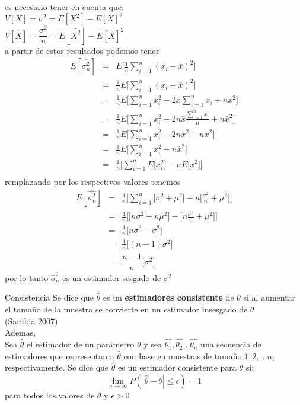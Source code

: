 \documentclass[base=hide,11pt]{elegantbook}
\begin{document}
{			
es necesario tener en cuenta que: \\
$V[X]=\sigma^ {2}=E[X^{2}]-E[X]^{2}$\\
$V[\bar{X}]=\dfrac{\sigma^ {2}}{n}=E[\bar{X^{2}}]-E[\bar{X}]^{2}$ \\
a partir de estos resultados podemos tener
\begin{eqnarray*}
E[\widehat{\sigma^{2}_{n}}]&=&E\Bigg[\frac{1}{n}\sum_{i=1}^ {n}(x_{i}-\bar{x})^{2}\Bigg]\\
&=&\frac{1}{n} E\Bigg[\sum_{i=1}^ {n}(x_{i}-\bar{x})^{2}\Bigg]\\
&=&\frac{1}{n} E\Bigg[\sum_{i=1}^ {n}x_{i}^{2}-2\bar{x} \sum_{i=1}^ {n} x_{i} +  n\bar{x}^{2}\Bigg]\\
&=&\frac{1}{n} E\Bigg[\sum_{i=1}^ {n}x_{i}^{2}-2n\bar{x} \frac{\sum_{i=1}^ {n} x_{i}}{n} +  n\bar{x}^{2}\Bigg]\\
&=&\frac{1}{n} E\Bigg[\sum_{i=1}^ {n}x_{i}^{2}-2n\bar{x}^{2} +  n\bar{x}^{2}\Bigg]\\
&=&\frac{1}{n} E\Bigg[\sum_{i=1}^ {n} x_{i}^{2}-n\bar{x}^{2}\Bigg]\\
&=&\frac{1}{n} \Bigg[\sum_{i=1}^ {n} E\big[x_{i}^{2}\big]-n E\big[\bar{x}^{2}\big]\Bigg]\\
\end{eqnarray*} 
remplazando por los respectivos valores tenemos
\begin{eqnarray*}
E[\widehat{\sigma^{2}_{n}}]&=&\frac{1}{n} \Bigg[\sum_{i=1}^ {n} \Big[ \sigma^{2}+\mu^ {2}\Big]-n \Big[\frac{\sigma^{2}}{n}+\mu^ {2}\Big]\Bigg]\\
&=&\frac{1}{n} \Bigg[\Big[n\sigma^{2}+n\mu^{2} \Big]- \Big[n \frac{\sigma^{2}}{n}+\mu^ {2}\Big]\Bigg]\\
&=&\frac{1}{n} \Bigg[ n \sigma^{2} - \sigma^{2}\Bigg] \\
&=&\frac{1}{n} \Bigg[ (n-1) \sigma^{2} \Bigg] \\
&=&\dfrac{n-1}{n}\big[\sigma^{2}\big]
\end{eqnarray*}
			por lo tanto $\widehat{\sigma}^{2}_{n}$ es  un estimador sesgado de $\sigma^{2}$ \\
			
			
%			
\begin{Box2}{Consistencia}
%			
Se dice que $\widehat{\theta}$ es un {\bf estimadores consistente} de $\theta$ si al aumentar el tamaño de la muestra se convierte en un estimador insesgado de $\theta$\\ 
(Sarabia 2007) 
\\
Ademas,\\ 		
%			
Sea $\widehat{\theta}$ el estimador de un parámetro $\theta$ y sea $\widehat{\theta_{1}},\widehat{\theta_{2}}...\widehat{\theta_{n}}$ una secuencia de estimadores que representan a $\widehat{\theta}$ con base en muestras de tamaño $1,2,...n$, respectivamente. Se dice que $\widehat{\theta}$ es un estimador consistente para $\theta$ si:
$$\lim_{n \to \infty} P(|\widehat{\theta} - \theta|\leq \epsilon)=1 $$
para todos los valores de $\theta$ y $\epsilon>0$
\end{Box2}			
%			


}
\end{document}
